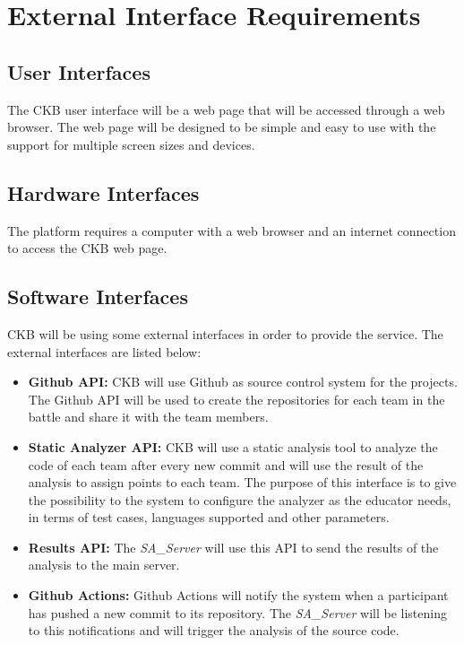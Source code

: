 
\section{External Interface Requirements}
\label{s:External_interface_requirements}%

\subsection{User Interfaces}
\label{ss:User_interfaces}%

The CKB user interface will be a web page that will be accessed through a web browser. The web page will be designed to be simple and easy to use with the support for multiple screen sizes and devices.

\subsection{Hardware Interfaces}
\label{ss:Hardware_interfaces}%

The platform requires a computer with a web browser and an internet connection to access the CKB web page. 

\subsection{Software Interfaces}
\label{ss:Software_interfaces}%

CKB will be using some external interfaces in order to provide the service. The external interfaces are listed below:
\begin{itemize}
  \item \textbf{Github API:} CKB will use Github as source control system for the projects. The Github API will be used to create the repositories for each team in the battle and share it with the team members.
  \item \textbf{Static Analyzer API:} CKB will use a static analysis tool to analyze the code of each team after every new commit and will use the result of the analysis to assign points to each team. The purpose of this interface is to give the possibility to the system to configure the analyzer as the educator needs, in terms of test cases, languages supported and other parameters.
  \item \textbf{Results API: } The \textit{SA\_Server} will use this API to send the results of the analysis to the main server.
  \item \textbf{Github Actions: } Github Actions will notify the system when a participant has pushed a new commit to its repository. The \textit{SA\_Server} will be listening to this notifications and will trigger the analysis of the source code.
\end{itemize}

